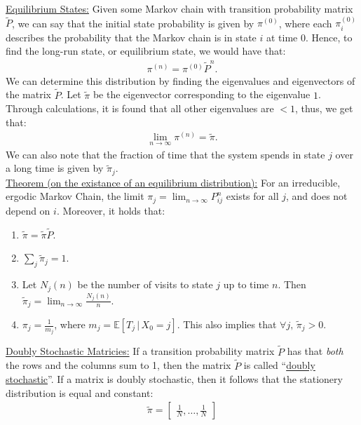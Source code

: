 \documentclass{article}
\newcommand{\sheader}[1]{\underline{#1:}}
\newcommand{\gap}{\medskip\\}
\newcommand{\ds}{\displaystyle}
\begin{document}
\sheader{Equilibrium States} Given some Markov chain with transition 
probability matrix $\widetilde{P}$, we can say that the initial state 
probability is given by ${\pi}^{(0)}$, where each ${\pi}_i^{(0)}$
describes the probability that the Markov chain is in state $i$ at time $0$.
Hence, to find the long-run state, or equilibrium state, we would have that:
\begin{align*}
    {\pi}^{(n)} = {\pi}^{(0)}\widetilde{P}^n.
\end{align*}
We can determine this distribution by finding the eigenvalues and 
eigenvectors of the matrix $\widetilde{P}$. Let $\widetilde{\pi}$ be 
the eigenvector corresponding to the eigenvalue $1$. Through calculations,
it is found that all other eigenvalues are $<1$, thus, we get that:
\begin{align*}
    \lim_{n\to \infty}\pi^{(n)} = \widetilde{\pi}.
\end{align*}
We can also note that the fraction of time that the system spends in 
state $j$ over a long time is given by $\widetilde{\pi}_j$.
\gap
\sheader{Theorem (on the existance of an equilibrium distribution)}
For an irreducible, ergodic Markov Chain, the limit $\ds \pi_j = \lim_{n\to\infty} P_{ij}^n$
exists for all $j$, and does not depend on $i$. Moreover, it holds that:
\begin{enumerate}[(1)]
    \item $\widetilde{\pi} = \widetilde{\pi}\widetilde{P}$.
    \item $\ds \sum_{j} \widetilde{\pi}_j = 1$.
    \item Let $N_j(n)$ be the number of visits to state $j$ up to 
    time $n$. Then $\ds \widetilde{\pi}_j = \lim_{n\to\infty}\frac{N_j(n)}{n}$.
    \item $\pi_j = \frac{1}{m_j}$, where $m_j = \mathbb{E}\left[T_j \,|\, X_0 = j\right]$.
    This also implies that $\forall j, \, \widetilde{\pi}_j > 0$.
\end{enumerate}


\sheader{Doubly Stochastic Matricies} If a transition probability matrix $\widetilde{P}$ has that \textit{both} the rows and the columns sum to 1, 
then the matrix $\widetilde{P}$ is called ``\underline{doubly stochastic}''.
If a matrix is doubly stochastic, then it follows that the stationery 
distribution is equal and constant:
\begin{align*}
    \widetilde{\pi} = \begin{bmatrix}
        \frac{1}{N}, \ldots, \frac{1}{N}
    \end{bmatrix}
\end{align*}
\end{document}
